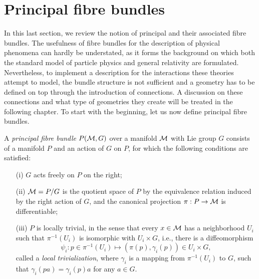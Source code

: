 \documentclass[
final,
11pt,
a4paper,
DIV=11,
headinclude=true,
footinclude=false,
bibliography=totoc,
twoside=true,  %
BCOR=5mm
]{scrbook}
\begin{document}
\section{Principal fibre bundles}
\label{sec:principal_bundles}

In this last section, we review the notion of principal and their 
associated fibre bundles. The usefulness of fibre bundles for the 
description of physical phenomena can hardly be understated, as 
it forms the background on which both the standard model of 
particle physics and general relativity are formulated.  
Nevertheless, to implement a description for the interactions 
these theories attempt to model, the bundle structure is not 
sufficient and a geometry has to be defined on top through the 
introduction of connections. A discussion on these connections 
and what type of geometries they create will be treated in the 
following chapter.  To start with the beginning, let us now 
define principal fibre bundles.

\begin{definition}
A \emph{principal fibre bundle} $P(\mathcal{M},G)$ over a manifold 
$\mathcal{M}$ with Lie group $G$ consists of a manifold $P$ and an 
action of $G$ on $P$, for which the following conditions are 
satisfied:
\begin{itemize}
  \item[(i)] $G$ acts freely on $P$ on the right;
  \item[(ii)] $\mathcal{M} = P/G$ is the quotient space of $P$ by the 
    equivalence relation induced by the right action of $G$, and 
    the canonical projection $\pi : P \to \mathcal{M}$ is 
    differentiable;
  \item[(iii)] $P$ is locally trivial, in the sense that every $x 
    \in \mathcal{M}$ has a neighborhood $U_i$ such that 
    $\pi^{-1}(U_i)$ is isomorphic with $U_i \times G$, i.e., 
    there is a diffeomorphism
    \begin{equation*}
      \psi_i : p \in \pi^{-1}(U_i) \mapsto (\pi(p),\gamma_i(p)) 
      \in U_i \times G,
    \end{equation*}
    called a \emph{local trivialization}, where $\gamma_i$ is a 
    mapping from $\pi^{-1}(U_i)$ to $G$, such that $\gamma_i(pa) 
    = \gamma_i(p)a$ for any $a \in G$.
\end{itemize}
\end{definition}
\end{document}
